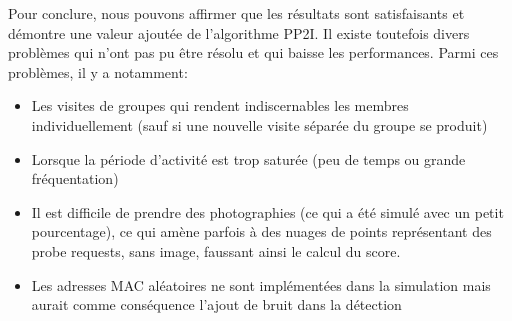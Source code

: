 Pour conclure, nous pouvons affirmer que les résultats sont satisfaisants et démontre une valeur ajoutée de l'algorithme PP2I. 
Il existe toutefois divers problèmes qui n'ont pas pu être résolu et qui baisse les performances. Parmi ces problèmes, il y a notamment:
\begin{itemize}
    \item Les visites de groupes qui rendent indiscernables les membres individuellement (sauf si une nouvelle visite séparée du groupe se produit)
    \item Lorsque la période d'activité est trop saturée (peu de temps ou grande fréquentation)
    \item Il est difficile de prendre des photographies (ce qui a été simulé avec un petit pourcentage), ce qui amène parfois à des nuages de points représentant des probe requests, sans image, faussant ainsi le calcul du score.
    \item Les adresses MAC aléatoires ne sont implémentées dans la simulation mais aurait comme conséquence l'ajout de bruit dans la détection 
\end{itemize}





